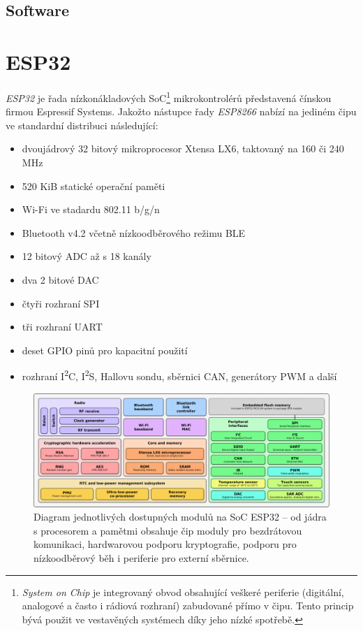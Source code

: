 \subsection{Software}

\section{ESP32}\label{sec:esp32}
\textit{ESP32} je řada nízkonákladových SoC\footnote{\textit{System on Chip} je integrovaný obvod obsahující veškeré
periferie (digitální, analogové a často i rádiová rozhraní) zabudované přímo v čipu.
Tento princip bývá použit ve vestavěných systémech díky jeho nízké spotřebě.} mikrokontrolérů představená čínskou
firmou Espressif Systems.
Jakožto nástupce řady \textit{ESP8266} nabízí na jediném čipu ve standardní distribuci následující:

\begin{itemize}
    \item dvoujádrový 32 bitový mikroprocesor Xtensa LX6, taktovaný na 160 či 240 MHz
    \item 520 KiB statické operační paměti
    \item Wi-Fi ve stadardu 802.11 b/g/n
    \item Bluetooth v4.2 včetně nízkoodběrového režimu BLE
    \item 12 bitový ADC až s 18 kanály
    \item dva 2 bitové DAC
    \item čtyři rozhraní SPI
    \item tři rozhraní UART
    \item deset GPIO pinů pro kapacitní použití
    \item rozhraní I\textsuperscript{2}C, I\textsuperscript{2}S, Hallovu sondu, sběrnici CAN, generátory PWM a další
\end{itemize}

\begin{figure}
    \centering
    \includegraphics[width=\textwidth]{figures/esp-diagram.png}

    \caption{Diagram jednotlivých dostupných modulů na SoC ESP32 -- od jádra s procesorem a pamětmi obsahuje čip
    moduly pro bezdrátovou komunikaci, hardwarovou podporu kryptografie, podporu pro nízkoodběrový běh i periferie
    pro externí sběrnice.}

    \label{fig:esp-diagram}
\end{figure}

